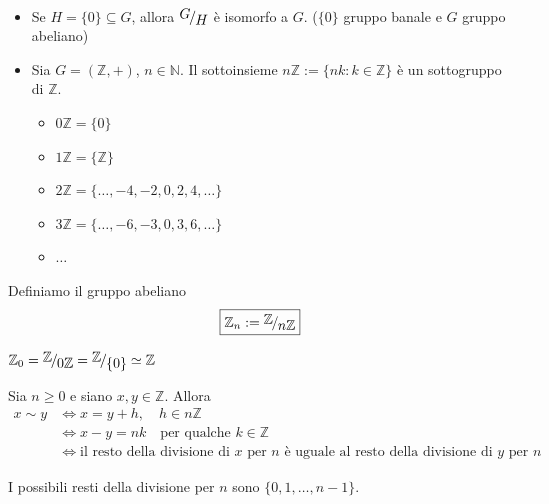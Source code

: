 \documentclass[../main.tex]{subfiles}
\begin{document}
\begin{example}
    \
    \begin{itemize}
        \item Se $H = \{0\} \subseteq G$, allora $\nicefrac{G}{H}$ è isomorfo a $G$. ($\{0\}$ gruppo banale e $G$ gruppo abeliano)
        \item Sia $G = (\mathbb{Z} , +)$, $ n \in \mathbb{N} $. Il sottoinsieme $n\mathbb{Z} := \{nk : k \in \mathbb{Z}\}$ è un sottogruppo di $\mathbb{Z}$.
              \begin{itemize}
                  \item $0 \mathbb{Z} = \{0\}$
                  \item $1 \mathbb{Z} = \{\mathbb{Z} \}$
                  \item $2 \mathbb{Z} = \{\ldots,-4,-2,0,2,4,\ldots\}$
                  \item $3 \mathbb{Z} = \{\ldots,-6,-3,0,3,6,\ldots\}$
                  \item $\ldots$
              \end{itemize}
    \end{itemize}
\end{example}
Definiamo il gruppo abeliano
\[
    \boxed{
        \mathbb{Z}_n := \nicefrac{\mathbb{Z}}{n\mathbb{Z}}
    }
\]
\begin{note}
    $\mathbb{Z}_0 = \nicefrac{\mathbb{Z}}{0 \mathbb{Z}} = \nicefrac{\mathbb{Z}}{\{0\}} \simeq \mathbb{Z}$
\end{note}
Sia $n \geq 0$ e siano $x,y \in \mathbb{Z}$. Allora
\begin{align*}
    x \sim y & \iff x = y + h, \quad h \in n\mathbb{Z}                                                               \\
             & \iff x-y = nk \quad \text{per qualche } k \in \mathbb{Z}                                              \\
             & \iff \text{il resto della divisione di $x$ per $n$ è uguale al resto  della divisione di $y$ per $n$}
\end{align*}

I possibili resti della divisione per $n$ sono $\{0,1,\ldots,n-1\}$.
\end{document}

